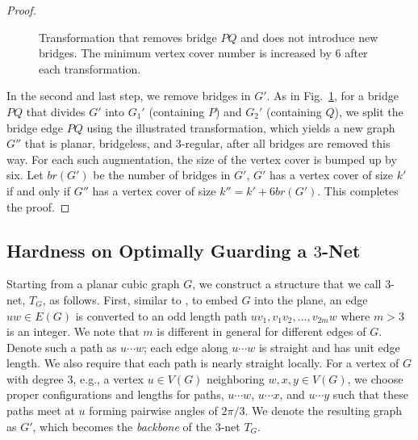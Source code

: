 \begin{proof}
\begin{figure}[!ht]
    \vspace{.5mm}
    \caption{Transformation that removes bridge $PQ$ and does not introduce new bridges.
    The minimum vertex cover number is increased by $6$ after each transformation.}
    \label{fig:rmbridge}
\end{figure}

In the second and last step, we remove bridges in $G'$. As in 
Fig.~\ref{fig:rmbridge}, for a bridge $PQ$ that divides $G'$ into $G_1'$ 
(containing $P$) and $G_2'$ (containing $Q$), we split the bridge edge 
$PQ$ using the illustrated transformation, which yields a new graph $G''$
that is planar, bridgeless, and $3$-regular, after all bridges are removed
this way. For each such augmentation, the size of the vertex cover is 
bumped up by six. Let $br(G')$ be the number of bridges in $G'$, $G'$ has 
a vertex cover of size  $k'$ if and only if $G''$ has a vertex cover 
of size $k'' = k'+6br(G')$. This completes the proof. 
\end{proof}


\subsection{Hardness on Optimally Guarding a $3$-Net}\label{complexity:3netcomp}
Starting from a planar cubic graph $G$, we construct a structure that we call 
$3$-net, $T_G$, as follows. 
%
First, similar to \cite{feder1988optimal}, to embed $G$ into the plane, 
an edge $uw \in E(G)$ is converted to an odd length path $uv_1, v_1v_2, 
\ldots, v_{2m}w$ where $m > 3$ is an integer. We note that $m$ is different
in general for different edges of $G$. 
Denote such a path as $u\cdots w$; each edge along $u\cdots w$ is straight 
and has unit edge length. We also require that each path is nearly straight 
locally. 
%
For a vertex of $G$ with degree $3$, e.g., a vertex $u \in V(G)$ 
neighboring $w, x, y \in V(G)$, we choose proper configurations and lengths for 
paths, $u\cdots w$, $u\cdots x$, and $u\cdots y$ such that
these paths meet at $u$ forming pairwise angles of $2\pi/3$. We denote the 
resulting graph as $G'$, which becomes the {\em backbone} of the 
$3$-net $T_G$. 

